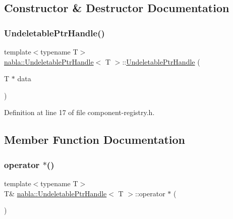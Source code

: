 \subsection{Constructor \& Destructor Documentation}
\mbox{\label{structnabla_1_1_undeletable_ptr_handle_afd1796a0e126eefde86a3cfd2f166238}} 
\subsubsection{\texorpdfstring{UndeletablePtrHandle()}{UndeletablePtrHandle()}}
{\footnotesize\ttfamily template$<$typename T$>$ \\
\mbox{\hyperlink{structnabla_1_1_undeletable_ptr_handle}{nabla\+::\+Undeletable\+Ptr\+Handle}}$<$ T $>$\+::\mbox{\hyperlink{structnabla_1_1_undeletable_ptr_handle}{Undeletable\+Ptr\+Handle}} (\begin{DoxyParamCaption}\item[{T $\ast$}]{data }\end{DoxyParamCaption})\hspace{0.3cm}{\ttfamily [inline]}}



Definition at line 17 of file component-\/registry.\+h.



\subsection{Member Function Documentation}
\mbox{\label{structnabla_1_1_undeletable_ptr_handle_a0d2936bd624f9b93e5772111525dab7b}} 
\subsubsection{\texorpdfstring{operator $\ast$()}{operator *()}\hspace{0.1cm}{\footnotesize\ttfamily [1/2]}}
{\footnotesize\ttfamily template$<$typename T$>$ \\
T\& \mbox{\hyperlink{structnabla_1_1_undeletable_ptr_handle}{nabla\+::\+Undeletable\+Ptr\+Handle}}$<$ T $>$\+::operator $\ast$ (\begin{DoxyParamCaption}{ }\end{DoxyParamCaption})\hspace{0.3cm}{\ttfamily [inline]}}




